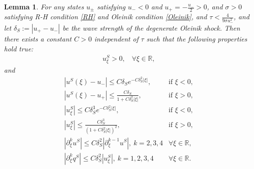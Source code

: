 \documentclass[10pt,reqno]{amsart}
\numberwithin{equation}{section}
\newtheorem{lemma}[theorem]{Lemma}
\begin{document}
	\begin{lemma}\label{lem0}
		For any states $u_{\pm}$ satisfying $u_{-}< 0$ and $u_{+}=-\frac{u_{-}}{2}>0$, and
		$\sigma>0$ satisfying R-H condition \eqref{RH} and Oleinik condition \eqref{Oleinik}, and $\tau<\frac{4}{9\sigma u_{-}^2}$, and let $\delta_{S} := |u_{+}-u_{-}|$ be the wave strength of the degenerate Oleinik shock. Then there exists a constant $C > 0$ independent of $\tau$ such that the following properties hold true:
		\begin{align*}
			u_{\xi}^{S}>0,\ \  \ \ \forall \xi\in \mathbb{R},
		\end{align*}
		and
		\begin{equation*}
			\begin{array}{ll}
				\left|u^S(\xi)-u_{-}\right| \leq C \delta_S e^{-C \delta_S^2|\xi|}, & \text {if } \xi<0, \\
				\left|u^S(\xi)-u_{+}\right| \leq \frac{C \delta_S}{1+C \delta_S^2|\xi|}, & \text {if } \xi>0, \\
				\left|u_{\xi}^S\right| \leq C \delta_S^3 e^{-C \delta_S^2|\xi|}, & \text {if } \xi<0, \\
				\left|u_{\xi}^S\right| \leq \frac{C \delta_S^3}{\left(1+C \delta_S^2|\xi|\right)^2}, & \text {if } \xi>0, \\
				\left|\partial_{\xi}^{k}u^S\right| \leq C \delta_S^2\left|\partial_{\xi}^{k-1}u^S\right|,\ k=2,3,4 &\forall \xi \in \mathbb{R}, \\
				\left|\partial_{\xi}^{k}q^{S}\right|\leq C\delta_{S}^2\left|u^{S}_{\xi}\right|,\ k=1,2,3,4 &\forall \xi \in \mathbb{R}.
			\end{array}
		\end{equation*}
	\end{lemma}
\end{document}
